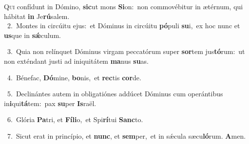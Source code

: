 \lettrine{\initial\textcolor{\initialcolor}{Q}}{ui} confídunt in Dómino, \textbf{sic}\-ut mons \textbf{Si}\-on:~\star non commovébitur in ætérnum, qui hábitat \textbf{in} Je\-\textbf{rú}\-salem.\\
{\numbfont\textcolor{\numbcolor}{~2.}}~Montes in circúitu ejus:~\dagger et Dóminus in circúitu \textbf{pó}\-puli \textbf{su}\-i,~\star ex hoc nunc et \textbf{us}\-que in \textbf{sǽ}\-culum.\par
{\numbfont\textcolor{\numbcolor}{~3.}}~Quia non relínquet Dóminus virgam peccatórum super \textbf{sor}\-tem jus\-\textbf{tó}\-rum:~\star ut non exténdant justi ad iniquitátem \textbf{ma}\-nus \textbf{su}\-as.\par
{\numbfont\textcolor{\numbcolor}{~4.}}~Bénefac, \textbf{Dó}\-mine, \textbf{bo}\-nis,~\star et \textbf{rec}\-tis \textbf{cor}\-de.\par
{\numbfont\textcolor{\numbcolor}{~5.}}~Declinántes autem in obligatiónes addúcet Dóminus cum operántibus in\-\textbf{i}\-qui\-\textbf{tá}\-tem:~\star pax \textbf{su}\-per \textbf{Is}\-raël.\par
{\numbfont\textcolor{\numbcolor}{~6.}}~Glória \textbf{Pa}\-tri, et \textbf{Fí}\-\textbf{li}o,~\star et Spi\-\textbf{rí}\-tui \textbf{Sanc}\-to.\par
{\numbfont\textcolor{\numbcolor}{~7.}}~Sicut erat in princípio, et \textbf{nunc}\-, et \textbf{sem}\-per,~\star et in sǽcula sæcu\-\textbf{ló}\-rum. \textbf{A}\-men.\par
